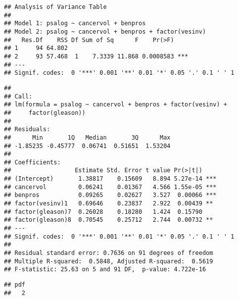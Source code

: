 \begin{knitrout}
\begin{kframe}
\begin{alltt}
\end{alltt}
\begin{verbatim}
## Analysis of Variance Table
##
## Model 1: psalog ~ cancervol + benpros
## Model 2: psalog ~ cancervol + benpros + factor(vesinv)
##   Res.Df    RSS Df Sum of Sq      F    Pr(>F)
## 1     94 64.802
## 2     93 57.468  1    7.3339 11.868 0.0008583 ***
## ---
## Signif. codes:  0 '***' 0.001 '**' 0.01 '*' 0.05 '.' 0.1 ' ' 1
\end{verbatim}
\begin{alltt}
 \hlkwb{<-}  \hlopt{~}  \hlopt{+}  \hlopt{+} 

\end{alltt}
\begin{verbatim}
##
## Call:
## lm(formula = psalog ~ cancervol + benpros + factor(vesinv) +
##     factor(gleason))
##
## Residuals:
##      Min       1Q   Median       3Q      Max
## -1.85235 -0.45777  0.06741  0.51651  1.53204
##
## Coefficients:
##                  Estimate Std. Error t value Pr(>|t|)
## (Intercept)       1.38817    0.15609   8.894 5.27e-14 ***
## cancervol         0.06241    0.01367   4.566 1.55e-05 ***
## benpros           0.09265    0.02627   3.527  0.00066 ***
## factor(vesinv)1   0.69646    0.23837   2.922  0.00439 **
## factor(gleason)7  0.26028    0.18280   1.424  0.15790
## factor(gleason)8  0.70545    0.25712   2.744  0.00732 **
## ---
## Signif. codes:  0 '***' 0.001 '**' 0.01 '*' 0.05 '.' 0.1 ' ' 1
##
## Residual standard error: 0.7636 on 91 degrees of freedom
## Multiple R-squared:  0.5848, Adjusted R-squared:  0.5619
## F-statistic: 25.63 on 5 and 91 DF,  p-value: 4.722e-16
\end{verbatim}
\begin{alltt}
\hlstd{(}\hlstd{,} \hlstd{=}\hlstd{,} \hlstd{=}\hlstd{)}
\hlstd{(} 
\hlstd{(} \hlstd{=} \hlstd{)}
\hlstd{()}
\end{alltt}
\begin{verbatim}
## pdf
##   2
\end{verbatim}
\begin{alltt}

\end{alltt}
\end{kframe}
\end{knitrout}
